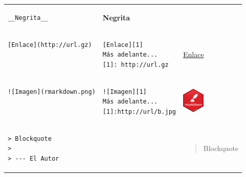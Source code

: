 \documentclass[]{book}
\theoremstyle{definition}
\theoremstyle{definition}
\theoremstyle{definition}
\theoremstyle{remark}
\begin{document}
\begin{longtable}[]{@{}lll@{}}
\begin{minipage}[t]{0.32\columnwidth}
\begin{verbatim}
__Negrita__
\end{verbatim}
\strut
\end{minipage} & \begin{minipage}[t]{0.32\columnwidth}\raggedright\strut
\textbf{Negrita}\strut
\end{minipage}\tabularnewline
\begin{minipage}[t]{0.32\columnwidth}\raggedright\strut
\begin{verbatim}
[Enlace](http://url.gz)
 
 
\end{verbatim}
\strut
\end{minipage} & \begin{minipage}[t]{0.32\columnwidth}\raggedright\strut
\begin{verbatim}
[Enlace][1]
Más adelante...
[1]: http://url.gz
\end{verbatim}
\strut
\end{minipage} & \begin{minipage}[t]{0.32\columnwidth}\raggedright\strut
\href{http://rmark\%20down.rstudio.com}{Enlace}\strut
\end{minipage}\tabularnewline
\begin{minipage}[t]{0.32\columnwidth}\raggedright\strut
\begin{verbatim}
![Imagen](rmarkdown.png)
 
 
\end{verbatim}
\strut
\end{minipage} & \begin{minipage}[t]{0.32\columnwidth}\raggedright\strut
\begin{verbatim}
![Imagen][1]
Más adelante...
[1]:http://url/b.jpg
\end{verbatim}
\strut
\end{minipage} & \begin{minipage}[t]{0.32\columnwidth}\raggedright\strut
\includegraphics{images/rmd.png}\strut
\end{minipage}\tabularnewline
\begin{minipage}[t]{0.32\columnwidth}\raggedright\strut
\begin{verbatim}
> Blockquote
>
> --- El Autor
\end{verbatim}
\strut
\end{minipage} & \begin{minipage}[t]{0.32\columnwidth}\raggedright\strut
\strut
\end{minipage} & \begin{minipage}[t]{0.32\columnwidth}\raggedright\strut
\begin{quote}
Blockquote


\end{quote}
\end{minipage}
\end{longtable}
\end{document}
